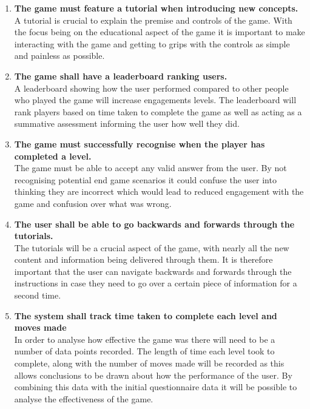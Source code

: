 \documentclass[12pt,a4paper]{report}
\begin{document}
\begin{enumerate}[label*=\arabic*]
 \item \textbf{The game must feature a tutorial when introducing new concepts.}\\
A tutorial is crucial to explain the premise and controls of the game. With the focus being on the educational aspect of the game it is important to make interacting with the game and getting to grips with the controls as simple and painless as possible.
	 
	  \item \textbf{The game shall have a leaderboard ranking users.}\\
A leaderboard showing how the user performed compared to other people who played the game will increase engagements levels. The leaderboard will rank players based on time taken to complete the game as well as acting as a summative assessment informing the user how well they did. 



 \item \textbf{The game must successfully recognise when the player has completed a level.}\\
The game must be able to accept any valid answer from the user. By not recognising potential end game scenarios it could confuse the user into thinking they are incorrect which would lead to reduced engagement with the game and confusion over what was wrong.	 	

	  \item \textbf{The user shall be able to go backwards and forwards through the tutorials.}\\
The tutorials will be a crucial aspect of the game, with nearly all the new content and information being delivered through them. It is therefore important that the user can navigate backwards and forwards through the instructions in case they need to go over a certain piece of information for a second time.
            
            	  \item \textbf{The system shall track time taken to complete each level and moves made}\\
In order to analyse how effective the game was there will need to be a number of data points recorded. The length of time each level took to complete, along with the number of moves made will be recorded as this allows conclusions to be drawn about how the performance of the user. By combining this data with the initial questionnaire data it will be possible to analyse the effectiveness of the game.
            

\end{enumerate}
\end{document}
